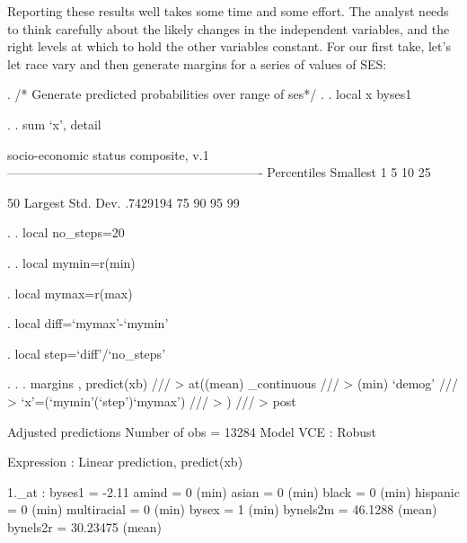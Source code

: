 \documentclass[12pt]{article}
\begin{document}
Reporting these results well takes some time and some effort. The
analyst needs to think carefully about the likely changes in the
independent variables, and the right levels at which to hold the other
variables constant. For our first take, let's let race vary and then
generate margins for a series of values of SES: 

\begin{stlog}

. /* Generate predicted probabilities over range of ses*/
. 
. local x byses1

. 
. sum `x', detail

            socio-economic status composite, v.1
-------------------------------------------------------------
      Percentiles      Smallest
 1%
 5%
10%
25%

50%
                        Largest       Std. Dev.      .7429194
75%
90%
95%
99%

. 
. local no_steps=20

. 
. local mymin=r(min)

. local mymax=r(max)

. local diff=`mymax'-`mymin'

. local step=`diff'/`no_steps'

. 
.     
. margins , predict(xb) ///
>     at((mean) _continuous ///
>         (min) `demog' ///
>         `x'=(`mymin'(`step')`mymax') ///          
>        ) ///
>       post

Adjusted predictions                              Number of obs   =      13284
Model VCE    : Robust

Expression   : Linear prediction, predict(xb)

1._at        : byses1          =       -2.11
               amind           =           0 (min)
               asian           =           0 (min)
               black           =           0 (min)
               hispanic        =           0 (min)
               multiracial     =           0 (min)
               bysex           =           1 (min)
               bynels2m        =     46.1288 (mean)
               bynels2r        =    30.23475 (mean)
\end{stlog}
\end{document}
